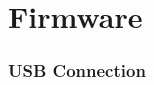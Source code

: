 \section{Firmware}
\label{Firmware}

\subsubsection{USB Connection}
\label{USB Connection}

\pagebreak